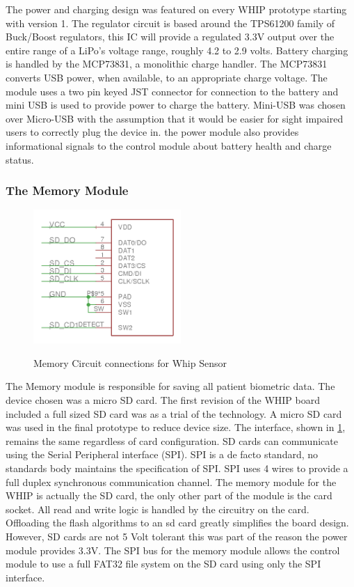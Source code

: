 The power and charging design was featured on every WHIP prototype starting with version 1. The regulator circuit is based around the TPS61200 family of Buck/Boost regulators\cite{TPS610X}, this IC will provide a regulated 3.3V output over the entire range of a LiPo's voltage range, roughly 4.2 to 2.9 volts. Battery charging is handled by the MCP73831, a monolithic charge handler\cite{MCP73831}. The MCP73831 converts USB power, when available, to an appropriate charge voltage. The module uses a two pin keyed JST connector for connection to the battery and mini USB is used to provide power to charge the battery. Mini-USB was chosen over Micro-USB with the assumption that it would be easier for sight impaired users to correctly plug the device in. the power module also provides informational signals to the control module about battery health and charge status.


\subsubsection {The Memory Module}
\begin{figure}
	\begin{center}
		\label{fig:Rev5_SDCARD}
		\includegraphics[scale=1,width=0.5\textwidth]{Images/Rev5_SDCARD.png} 
		\caption{Memory Circuit connections for Whip Sensor}
	\end{center}
\end{figure}
The Memory module is responsible for saving all patient biometric data. The device chosen was a micro SD card. The first revision of the WHIP board included a full sized SD card was as a trial of the technology. A micro SD card was used in the final prototype to reduce device size. The interface, shown in \cref{fig:Rev5_SDCARD}, remains the same regardless of card configuration. SD cards can communicate using the Serial Peripheral interface (SPI). SPI is a de facto standard, no standards body maintains the specification of SPI. SPI uses 4 wires to provide a full duplex synchronous communication channel. The memory module for the WHIP is actually the SD card, the only other part of the module is the card socket. All read and write logic is handled by the circuitry on the card. Offloading the flash algorithms to an sd card greatly simplifies the board design. However, SD cards are not 5 Volt tolerant this was part of the reason the power module provides 3.3V. The SPI bus for the memory module allows the control module to use a full FAT32 file system on the SD card using only the SPI interface.

